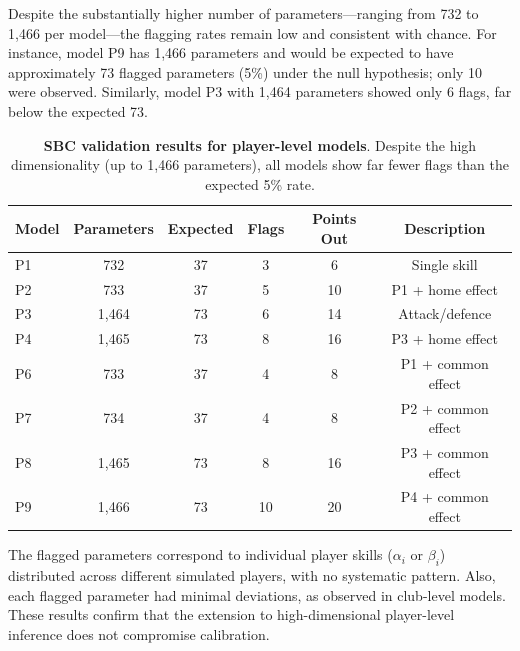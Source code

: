 Despite the substantially higher number of parameters—ranging from 732 to 1,466 per model—the flagging rates remain low and consistent with chance.
For instance, model P9 has 1,466 parameters and would be expected to have approximately 73 flagged parameters (5\%) under the null hypothesis; only 10 were observed.
Similarly, model P3 with 1,464 parameters showed only 6 flags, far below the expected 73.

\begin{table}[htbp]
    \centering
    \begin{tabular}{lccccc}
        \toprule
        Model & Parameters & Expected & Flags & Points Out & Description \\
        \midrule
        P1  & 732   & 37 & 3  & 6  & Single skill \\
        P2  & 733   & 37 & 5  & 10 & P1 + home effect \\
        P3  & 1,464 & 73 & 6  & 14 & Attack/defence \\
        P4  & 1,465 & 73 & 8  & 16 & P3 + home effect \\
        P6  & 733   & 37 & 4  & 8  & P1 + common effect \\
        P7  & 734   & 37 & 4  & 8  & P2 + common effect \\
        P8  & 1,465 & 73 & 8  & 16 & P3 + common effect \\
        P9  & 1,466 & 73 & 10 & 20 & P4 + common effect \\
        \bottomrule
    \end{tabular}
    \caption{
        \textbf{SBC validation results for player-level models}.
        Despite the high dimensionality (up to 1,466 parameters), all models show far fewer flags than the expected 5\% rate.
    }
    \label{tab:sbc_player}
\end{table}

The flagged parameters correspond to individual player skills ($\alpha_i$ or $\beta_i$) distributed across different simulated players, with no systematic pattern.
Also, each flagged parameter had minimal deviations, as observed in club-level models.
These results confirm that the extension to high-dimensional player-level inference does not compromise calibration.
